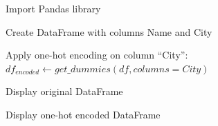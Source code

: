 \begin{algorithm}
\caption{Convert Categorical Column into One-Hot Encoding using Pandas}
\begin{algorithmic}[1]

\STATE Import Pandas library

\STATE Create DataFrame with columns Name and City

\STATE Apply one-hot encoding on column ``City'':
\STATE $df_{encoded} \gets get\_dummies(df, columns = City)$

\STATE Display original DataFrame

\STATE Display one-hot encoded DataFrame

\end{algorithmic}
\end{algorithm}